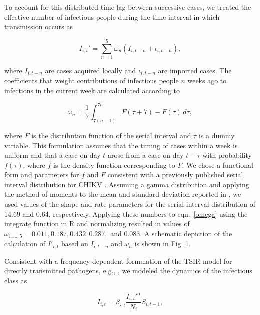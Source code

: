 \documentclass[11pt]{article}
\begin{document}
To account for this distributed time lag between successive cases, we treated the effective number of infectious people during the time interval in which transmission occurs as

\vspace{-11pt}
\begin{equation}
I_{i,t}' = \sum_{n=1}^5 \omega_n \left( I_{i,t-n} + \iota_{i,t-n} \right) ,
\end{equation}

\noindent where $I_{i,t-n}$ are cases acquired locally and $\iota_{i,t-n}$ are imported cases. The coefficients that weight contributions of infectious people $n$ weeks ago to infections in the current week are calculated according to

\vspace{-11pt}
\begin{equation}
\omega_n = \frac{1}{7} \int_{7(n-1)}^{7n} F(\tau+7)-F(\tau) \, d\tau ,
\label{omega}
\end{equation}

\noindent where $F$ is the distribution function of the serial interval and $\tau$ is a dummy variable. This formulation assumes that the timing of cases within a week is uniform and that a case on day $t$ arose from a case on day $t-\tau$ with probability $f(\tau)$, where $f$ is the density function corresponding to $F$. We chose a functional form and parameters for $f$ and $F$ consistent with a previously published serial interval distribution for CHIKV \cite{Cauchemez2014}. Assuming a gamma distribution and applying the method of moments to the mean and standard deviation reported in \cite{Cauchemez2014}, we used values of the shape and rate parameters for the serial interval distribution of 14.69 and 0.64, respectively. Applying these numbers to eqn.~\eqref{omega} using the integrate function in R \cite{R} and normalizing resulted in values of $\omega_{1,\ldots,5}=0.011,0.187,0.432,0.287,$ and $0.083$. A schematic depiction of the calculation of $I'_{i,t}$ based on $I_{i,t-n}$ and $\omega_n$ is shown in Fig. 1.

Consistent with a frequency-dependent formulation of the TSIR model for directly transmitted pathogens, e.g., \cite{Xia2004}, we modeled the dynamics of the infectious class as

\vspace{-11pt}
\begin{equation}
I_{i,t} = \beta_{i,t} \frac{ {I_{i,t}'} ^ \alpha}{N_i} S_{i,t-1} ,
\label{TSIR}
\end{equation}
\end{document}
